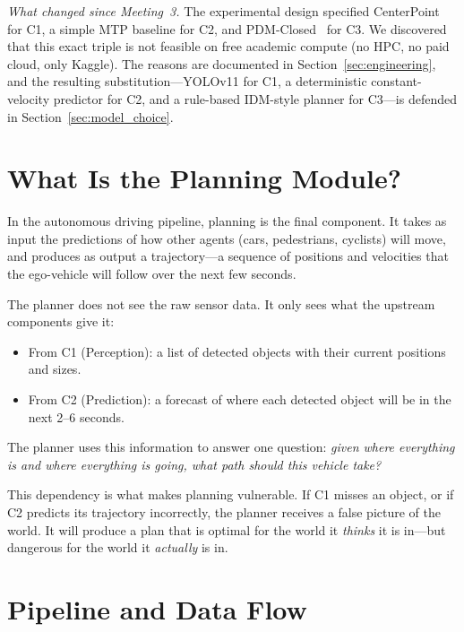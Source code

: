 \documentclass[11pt,a4paper]{article}
\begin{document}
\smallskip\noindent\textit{What changed since Meeting~3.} The
experimental design specified CenterPoint~\cite{yin2021center} for
C1, a simple MTP baseline for C2, and PDM-Closed~\cite{dauner2023parting}
for C3. We discovered that this exact triple is not feasible on free
academic compute (no HPC, no paid cloud, only Kaggle). The reasons
are documented in Section~\ref{sec:engineering}, and the resulting
substitution---YOLOv11 for C1, a deterministic constant-velocity
predictor for C2, and a rule-based IDM-style planner for C3---is
defended in Section~\ref{sec:model_choice}.

\section{What Is the Planning Module?}

In the autonomous driving pipeline, planning is the final component.
It takes as input the predictions of how other agents (cars,
pedestrians, cyclists) will move, and produces as output a
trajectory---a sequence of positions and velocities that the
ego-vehicle will follow over the next few seconds.

The planner does not see the raw sensor data. It only sees what the
upstream components give it:
\begin{itemize}
    \item From C1 (Perception): a list of detected objects with their
          current positions and sizes.
    \item From C2 (Prediction): a forecast of where each detected
          object will be in the next 2--6 seconds.
\end{itemize}

The planner uses this information to answer one question: \emph{given
where everything is and where everything is going, what path should
this vehicle take?}

This dependency is what makes planning vulnerable. If C1 misses an
object, or if C2 predicts its trajectory incorrectly, the planner
receives a false picture of the world. It will produce a plan that is
optimal for the world it \emph{thinks} it is in---but dangerous for
the world it \emph{actually} is in.

\section{Pipeline and Data Flow}
\label{sec:pipeline}
\end{document}
